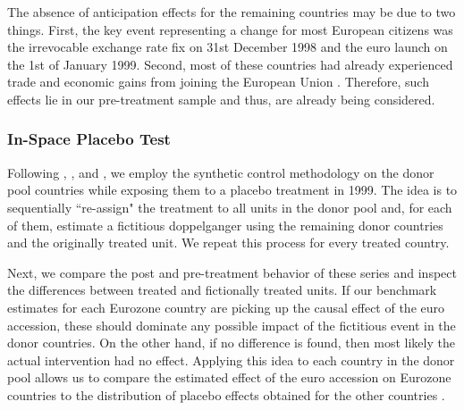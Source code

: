 \documentclass[12pt]{article}
\begin{document}



The absence of anticipation effects for the remaining countries may be due to two things. First, the key event representing a change for most European citizens was the irrevocable exchange rate fix on 31st December 1998 and the euro launch on the 1st of January 1999. Second, most of these countries had already experienced trade and economic gains from joining the European Union \citep{Campos2018}. Therefore, such effects lie in our pre-treatment sample and thus, are already being considered.

\subsubsection{In-Space Placebo Test \label{SS_spaceplacebo}}

Following \cite{Abadie2010}, \cite{Abadie2018}, and \cite{Firpo2018}, we employ the synthetic control methodology on the donor pool countries while exposing them to a placebo treatment in 1999. The idea is to sequentially ``re-assign" the treatment to all units in the donor pool and, for each of them, estimate a fictitious doppelganger using the remaining donor countries and the originally treated unit. We repeat this process for every treated country.

Next, we compare the post and pre-treatment behavior of these series and inspect the differences between treated and fictionally treated units. If our benchmark estimates for each Eurozone country are picking up the causal effect of the euro accession, these should dominate any possible impact of the fictitious event in the donor countries. On the other hand, if no difference is found, then most likely the actual intervention had no effect. Applying this idea to each country in the donor pool allows us to compare the estimated effect of the euro accession on Eurozone countries to the distribution of placebo effects obtained for the other countries \citep{Abadie2015}.
\end{document}
